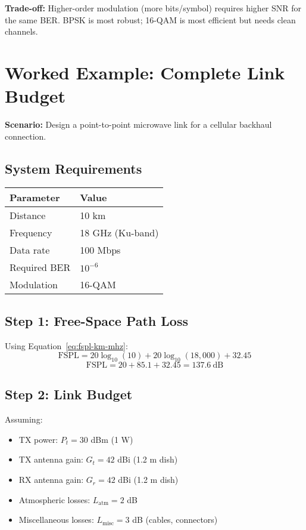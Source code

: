 \begin{keyconcept}
\textbf{Trade-off:} Higher-order modulation (more bits/symbol) requires higher SNR for the same BER. BPSK is most robust; 16-QAM is most efficient but needs clean channels.
\end{keyconcept}

\section{Worked Example: Complete Link Budget}
\label{sec:worked-example}

\textbf{Scenario:} Design a point-to-point microwave link for a cellular backhaul connection.

\subsection*{System Requirements}

\begin{tabular}{@{}ll@{}}
\toprule
\textbf{Parameter} & \textbf{Value} \\
\midrule
Distance & 10 km \\
Frequency & 18 GHz (Ku-band) \\
Data rate & 100 Mbps \\
Required BER & $10^{-6}$ \\
Modulation & 16-QAM \\
\bottomrule
\end{tabular}

\subsection*{Step 1: Free-Space Path Loss}

Using Equation~\ref{eq:fspl-km-mhz}:
\begin{equation}
\text{FSPL} = 20\log_{10}(10) + 20\log_{10}(18{,}000) + 32.45
\end{equation}
\begin{equation}
\text{FSPL} = 20 + 85.1 + 32.45 = 137.6\ \text{dB}
\end{equation}

\subsection*{Step 2: Link Budget}

Assuming:
\begin{itemize}
\item TX power: $P_t = 30$ dBm (1 W)
\item TX antenna gain: $G_t = 42$ dBi (1.2 m dish)
\item RX antenna gain: $G_r = 42$ dBi (1.2 m dish)
\item Atmospheric losses: $L_{\text{atm}} = 2$ dB
\item Miscellaneous losses: $L_{\text{misc}} = 3$ dB (cables, connectors)
\end{itemize}

